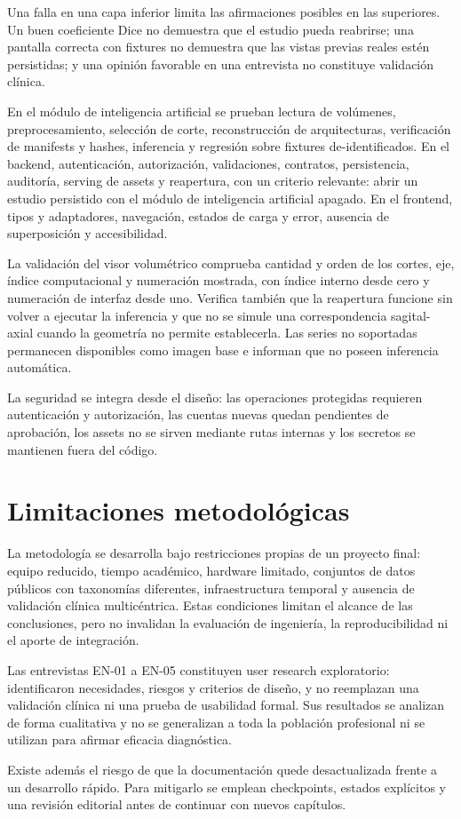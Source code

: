 Una falla en una capa inferior limita las afirmaciones posibles en las superiores. Un buen coeficiente Dice no demuestra que el estudio pueda reabrirse; una pantalla correcta con fixtures no demuestra que las vistas previas reales estén persistidas; y una opinión favorable en una entrevista no constituye validación clínica.

En el módulo de inteligencia artificial se prueban lectura de volúmenes, preprocesamiento, selección de corte, reconstrucción de arquitecturas, verificación de manifests y hashes, inferencia y regresión sobre fixtures de-identificados. En el backend, autenticación, autorización, validaciones, contratos, persistencia, auditoría, serving de assets y reapertura, con un criterio relevante: abrir un estudio persistido con el módulo de inteligencia artificial apagado. En el frontend, tipos y adaptadores, navegación, estados de carga y error, ausencia de superposición y accesibilidad.

La validación del visor volumétrico comprueba cantidad y orden de los cortes, eje, índice computacional y numeración mostrada, con índice interno desde cero y numeración de interfaz desde uno. Verifica también que la reapertura funcione sin volver a ejecutar la inferencia y que no se simule una correspondencia sagital-axial cuando la geometría no permite establecerla. Las series no soportadas permanecen disponibles como imagen base e informan que no poseen inferencia automática.

La seguridad se integra desde el diseño: las operaciones protegidas requieren autenticación y autorización, las cuentas nuevas quedan pendientes de aprobación, los assets no se sirven mediante rutas internas y los secretos se mantienen fuera del código.

\section{Limitaciones metodológicas}

La metodología se desarrolla bajo restricciones propias de un proyecto final: equipo reducido, tiempo académico, hardware limitado, conjuntos de datos públicos con taxonomías diferentes, infraestructura temporal y ausencia de validación clínica multicéntrica. Estas condiciones limitan el alcance de las conclusiones, pero no invalidan la evaluación de ingeniería, la reproducibilidad ni el aporte de integración.

Las entrevistas EN-01 a EN-05 constituyen user research exploratorio: identificaron necesidades, riesgos y criterios de diseño, y no reemplazan una validación clínica ni una prueba de usabilidad formal. Sus resultados se analizan de forma cualitativa y no se generalizan a toda la población profesional ni se utilizan para afirmar eficacia diagnóstica.

Existe además el riesgo de que la documentación quede desactualizada frente a un desarrollo rápido. Para mitigarlo se emplean checkpoints, estados explícitos y una revisión editorial antes de continuar con nuevos capítulos.
